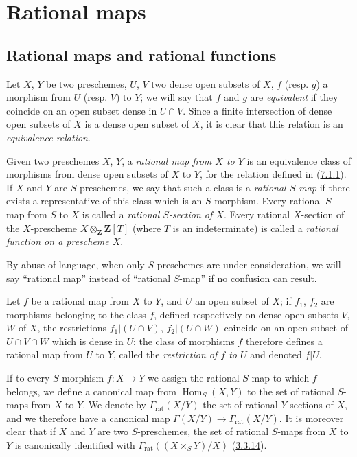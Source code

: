 \section{Rational maps}
\label{section:I.7}

\subsection{Rational maps and rational functions}
\label{subsection:I.7.1}

\begin{env}[7.1.1]
\label{I.7.1.1}
Let $X$, $Y$ be two preschemes, $U$, $V$ two dense open subsets of $X$, $f$
(resp. $g$) a morphism from $U$ (resp. $V$) to $Y$; we will say that $f$ and
$g$ are
\emph{equivalent} if they coincide on an open subset dense in $U\cap V$.
Since a finite intersection of dense open subsets of $X$ is a dense open
subset of $X$, it is clear that this relation is an
\emph{equivalence relation}.
\end{env}

\begin{definition}[7.1.2]
\label{I.7.1.2}
Given two preschemes $X$, $Y$, a
\emph{rational map from $X$ to $Y$} is an equivalence class of morphisms from
dense open subsets of $X$ to $Y$, for the relation defined in
(\hyperref[I.7.1.1]{7.1.1}). If $X$ and $Y$ are
$S$-preschemes, we say that such a class is a
\emph{rational $S$-map} if there exists a representative of this class which
is an $S$-morphism. Every rational $S$-map from $S$ to $X$ is called a
\emph{rational $S$-section of $X$}.
Every rational $X$-section of the $X$-prescheme
$X\otimes_{\mathbf{Z}}\mathbf{Z}[T]$ (where $T$ is an indeterminate) is called
a \emph{rational function on a prescheme $X$}.
\end{definition}

By abuse of language, when only $S$-preschemes are under consideration, we
will say ``rational map'' instead of ``rational $S$-map'' if no confusion can
result.

Let $f$ be a rational map from $X$ to $Y$, and $U$ an open subset of $X$; if
$f_1$, $f_2$ are morphisms belonging to the class $f$, defined respectively on
dense open subsets $V$, $W$ of $X$, the restrictions $f_1|(U\cap V)$,
$f_2|(U\cap W)$ coincide on an open subset of $U\cap V\cap W$ which is dense
in $U$; the class of morphisms $f$ therefore defines a rational map from $U$
to $Y$, called the
\emph{restriction of $f$ to $U$} and denoted $f|U$.

If to every $S$-morphism $f:X\to Y$ we assign the rational $S$-map
to which $f$ belongs, we define a canonical map from
$\operatorname{Hom}_S(X,Y)$ to the set of rational $S$-maps from $X$ to $Y$.
We denote by $\Gamma_{\mathrm{rat}}(X/Y)$ the set of rational $Y$-sections of
$X$, and we therefore have a canonical map
$\Gamma(X/Y)\to\Gamma_{\mathrm{rat}}(X/Y)$. It is moreover clear that if $X$
and $Y$ are two $S$-preschemes, the set of rational $S$-maps from $X$ to $Y$
is canonically identified with
$\Gamma_{\mathrm{rat}}((X\times_S Y)/X)$
(\hyperref[I.3.3.14]{3.3.14}).

